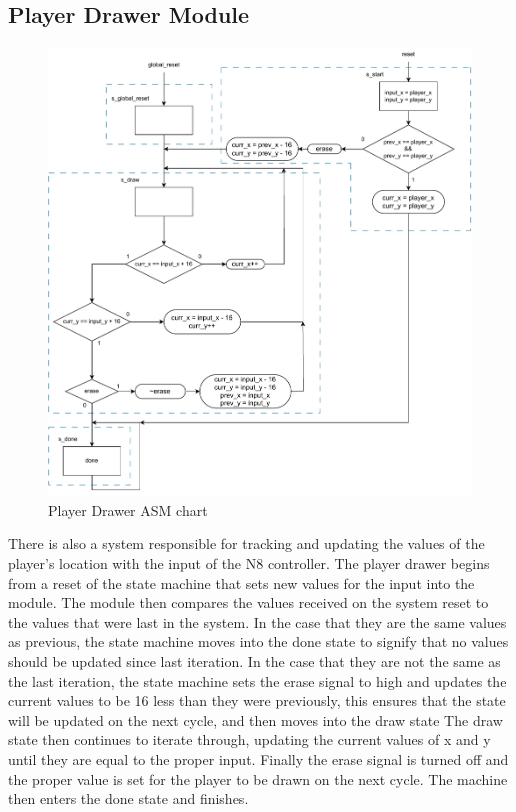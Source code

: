 \documentclass[11pt, titlepage]{article}
\begin{document}
        \subsection{Player Drawer Module}
            \begin{figure}[H]
                \centering
                \includegraphics[scale = 0.57]{Images/Player Drawer.pdf}
                \caption{Player Drawer ASM chart}
            \end{figure}
            There is also a system responsible for tracking and updating the values of the player's location with the input of the N8 controller. The player drawer begins from a reset of the state machine that sets new values for the input into the module. The module then compares the values received on the system reset to the values that were last in the system. In the case that they are the same values as previous, the state machine moves into the done state to signify that no values should be updated since last iteration. In the case that they are not the same as the last iteration, the state machine sets the erase signal to high and updates the current values to be 16 less than they were previously, this ensures that the state will be updated on the next cycle, and then moves into the draw state The draw state then continues to iterate through, updating the current values of x and y until they are equal to the proper input. Finally the erase signal is turned off and the proper value is set for the player to be drawn on the next cycle. The machine then enters the done state and finishes.
\end{document}

